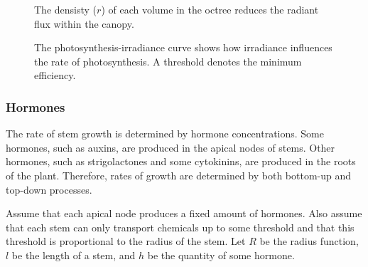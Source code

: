 \documentclass[10pt]{article}
\begin{document}
\begin{figure}[H]
\begin{minipage}[t]{0.48\textwidth}
\caption{The densisty ($ r $) of each volume in the octree reduces the radiant flux within the canopy.}
\end{minipage}
\hfill
\begin{minipage}[t]{0.48\textwidth}
\caption{The photosynthesis-irradiance curve shows how irradiance influences the rate of photosynthesis. A threshold denotes the minimum efficiency.}
\end{minipage}
\end{figure}

\subsubsection{Hormones}
The rate of stem growth is determined by hormone concentrations. Some hormones, such as auxins, are produced in the apical nodes of stems. Other hormones, such as strigolactones and some cytokinins, are produced in the roots of the plant. Therefore, rates of growth are determined by both bottom-up and top-down processes.

Assume that each apical node produces a fixed amount of hormones. Also assume that each stem can only transport chemicals up to some threshold and that this threshold is proportional to the radius of the stem. Let $ R $ be the radius function, $ l $ be the length of a stem, and $ h $ be the quantity of some hormone.
\end{document}
